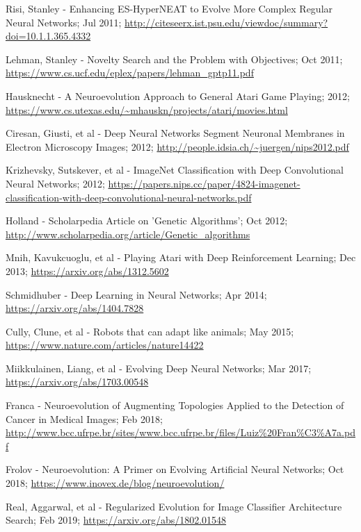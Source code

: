 \documentclass[journal, a4paper]{IEEEtran}
\begin{document}
\begin{thebibliography}{5}
    Risi, Stanley - Enhancing ES-HyperNEAT to Evolve More Complex Regular Neural Networks; Jul 2011;
    \url{http://citeseerx.ist.psu.edu/viewdoc/summary?doi=10.1.1.365.4332}

    Lehman, Stanley - Novelty Search and the Problem with Objectives; Oct 2011;
    \url{https://www.cs.ucf.edu/eplex/papers/lehman_gptp11.pdf}

    Hausknecht - A Neuroevolution Approach to General Atari Game Playing; 2012;
    \url{https://www.cs.utexas.edu/~mhauskn/projects/atari/movies.html}

    Ciresan, Giusti, et al - Deep Neural Networks Segment Neuronal Membranes in Electron Microscopy Images; 2012;
    \url{http://people.idsia.ch/~juergen/nips2012.pdf}

    Krizhevsky, Sutskever, et al - ImageNet Classification with Deep Convolutional Neural Networks; 2012;
    \url{https://papers.nips.cc/paper/4824-imagenet-classification-with-deep-convolutional-neural-networks.pdf}

    Holland - Scholarpedia Article on 'Genetic Algorithms'; Oct 2012;
    \url{http://www.scholarpedia.org/article/Genetic_algorithms}

    Mnih, Kavukcuoglu, et al - Playing Atari with Deep Reinforcement Learning; Dec 2013;
    \url{https://arxiv.org/abs/1312.5602}

    Schmidhuber - Deep Learning in Neural Networks; Apr 2014;
    \url{https://arxiv.org/abs/1404.7828}

    Cully, Clune, et al - Robots that can adapt like animals; May 2015;
    \url{https://www.nature.com/articles/nature14422}

    Miikkulainen, Liang, et al - Evolving Deep Neural Networks; Mar 2017;
    \url{https://arxiv.org/abs/1703.00548}

    Franca - Neuroevolution of Augmenting Topologies Applied to the Detection of Cancer in Medical Images; Feb 2018;
    \url{http://www.bcc.ufrpe.br/sites/www.bcc.ufrpe.br/files/Luiz%20Fran%C3%A7a.pdf}

    Frolov - Neuroevolution: A Primer on Evolving Artificial Neural Networks; Oct 2018;
    \url{https://www.inovex.de/blog/neuroevolution/}

    Real, Aggarwal, et al - Regularized Evolution for Image Classifier Architecture Search; Feb 2019;
    \url{https://arxiv.org/abs/1802.01548}


\end{thebibliography}
\end{document}
